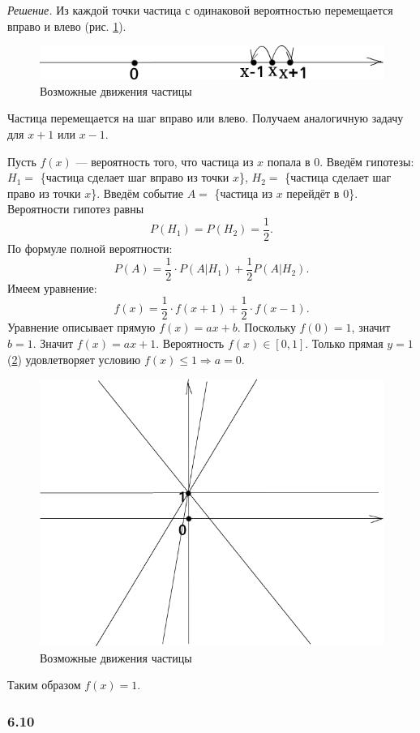 \textit{Решение.} Из каждой точки частица с одинаковой вероятностью перемещается вправо и влево (рис. \ref{fig:69}).

\begin{figure}[h!]
  \centering
  \includegraphics[width=.4\textwidth]{./pictures/6_9.png}
  \caption{Возможные движения частицы}
  \label{fig:69}
\end{figure}

Частица перемещается на шаг вправо или влево.
Получаем аналогичную задачу для $x + 1$ или $x - 1$.

Пусть $f \left( x \right) $ --- вероятность того, что частица из $x$ попала в 0.
Введём гипотезы: $H_1 =$ \{частица сделает шаг вправо из точки $x$\}, $H_2 =$ \{частица сделает шаг право из точки $x$\}.
Введём событие $A =$ \{частица из $x$ перейдёт в 0\}.
Вероятности гипотез равны
$$P \left( H_1 \right) =
P \left( H_2 \right) =
\frac{1}{2}.$$
По формуле полной вероятности:
$$P \left( A \right) =
\frac{1}{2} \cdot P \left( \left. A \right| H_1 \right) + \frac{1}{2} P \left( \left. A \right| H_2 \right).$$
Имеем уравнение:
$$f \left( x \right) =
\frac{1}{2} \cdot f \left( x+1 \right) + \frac{1}{2} \cdot f \left( x-1 \right).$$
Уравнение описывает прямую $f \left( x \right) = ax + b$.
Поскольку $f \left( 0 \right) = 1$, значит $b = 1$.
Значит $f \left( x \right) = ax + 1$.
Вероятность $f \left( x \right) \in \left[ 0, 1 \right] $.
Только прямая $y = 1$ (\ref{fig:691}) удовлетворяет условию $f \left( x \right) \leq 1 \Rightarrow a = 0$.

\begin{figure}[h!]
  \centering
  \includegraphics[width=.4\textwidth]{./pictures/6_9_1.png}
  \caption{Возможные движения частицы}
  \label{fig:691}
\end{figure}

Таким образом $f \left( x \right) = 1$.

\subsubsection*{6.10}

